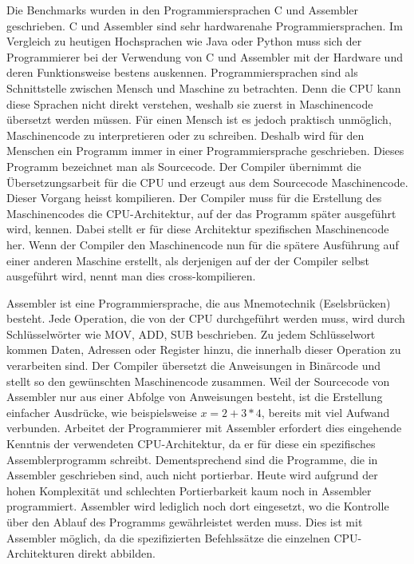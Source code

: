 Die Benchmarks wurden in den Programmiersprachen C und Assembler geschrieben. C und Assembler sind sehr hardwarenahe Programmiersprachen. Im Vergleich zu heutigen Hochsprachen wie Java oder Python muss sich der Programmierer bei der Verwendung von C und Assembler mit der Hardware und deren Funktionsweise bestens auskennen. Programmiersprachen sind als Schnittstelle zwischen Mensch und Maschine zu betrachten. Denn die CPU kann diese Sprachen nicht direkt verstehen, weshalb sie zuerst in Maschinencode übersetzt werden müssen. Für einen Mensch ist es jedoch praktisch unmöglich, Maschinencode zu interpretieren oder zu schreiben. Deshalb wird für den Menschen ein Programm immer in einer Programmiersprache geschrieben. Dieses Programm bezeichnet man als Sourcecode. Der Compiler übernimmt die Übersetzungsarbeit für die CPU und erzeugt aus dem Sourcecode Maschinencode. Dieser Vorgang heisst kompilieren. Der Compiler muss für die Erstellung des Maschinencodes die CPU-Architektur, auf der das Programm später ausgeführt wird, kennen. Dabei stellt er für diese Architektur spezifischen Maschinencode her. Wenn der Compiler den Maschinencode nun für die spätere Ausführung auf einer anderen Maschine erstellt, als derjenigen auf der der Compiler selbst ausgeführt wird, nennt man dies cross-kompilieren.
\par
Assembler ist eine Programmiersprache, die aus Mnemotechnik (Eselsbrücken) besteht. Jede Operation, die von der CPU durchgeführt werden muss, wird durch Schlüsselwörter wie MOV, ADD, SUB beschrieben. Zu jedem Schlüsselwort kommen Daten, Adressen oder Register hinzu, die innerhalb dieser Operation zu verarbeiten sind. Der Compiler übersetzt die Anweisungen in Binärcode und stellt so den gewünschten Maschinencode zusammen. Weil der Sourcecode von Assembler nur aus einer Abfolge von Anweisungen besteht, ist die Erstellung einfacher Ausdrücke, wie beispielsweise $x = 2 + 3 * 4$, bereits mit viel Aufwand verbunden. Arbeitet der Programmierer mit Assembler erfordert dies eingehende Kenntnis der verwendeten CPU-Architektur, da er für diese ein spezifisches Assemblerprogramm schreibt. Dementsprechend sind die Programme, die in Assembler geschrieben sind, auch nicht portierbar. Heute wird aufgrund der hohen Komplexität und schlechten Portierbarkeit kaum noch in Assembler programmiert. Assembler wird lediglich noch dort eingesetzt, wo die Kontrolle über den Ablauf des Programms gewährleistet werden muss. Dies ist mit Assembler möglich, da die spezifizierten Befehlssätze die einzelnen CPU-Architekturen direkt abbilden.
\par
